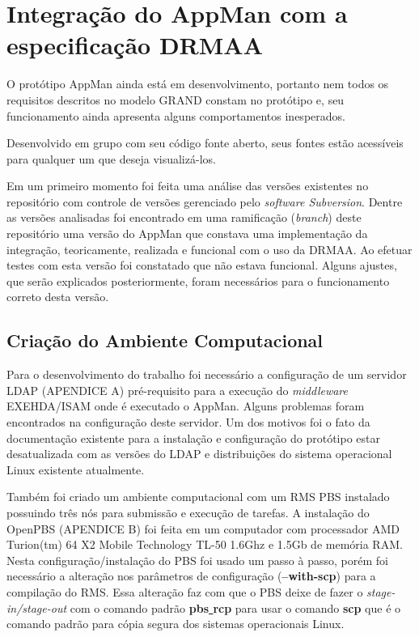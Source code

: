 \chapter{Integração do AppMan com a especificação {DRMAA}}
\label{cap:implementacao}

O protótipo AppMan ainda está em desenvolvimento, portanto nem todos os requisitos descritos no modelo GRAND constam no protótipo e, seu funcionamento ainda apresenta alguns comportamentos inesperados. 

Desenvolvido em grupo com seu código fonte aberto, seus fontes estão acessíveis para qualquer um que deseja visualizá-los. 

Em um primeiro momento foi feita uma análise das versões existentes no repositório com controle de versões gerenciado pelo \emph{software Subversion}. Dentre as versões analisadas foi encontrado em uma ramificação (\emph{branch}) deste repositório uma versão do AppMan que constava uma implementação da integração, teoricamente, realizada e funcional com o uso da DRMAA. Ao efetuar testes com esta versão foi constatado que não estava funcional. Alguns ajustes, que serão explicados posteriormente, foram necessários para o funcionamento correto desta versão.

\section{Criação do Ambiente Computacional}

Para o desenvolvimento do trabalho foi necessário a configuração de um servidor LDAP (APENDICE A) pré-requisito para a execução do \emph{middleware} EXEHDA/ISAM onde é executado o AppMan. Alguns problemas foram encontrados na configuração deste servidor. Um dos motivos foi o fato da documentação existente para a instalação e configuração do protótipo estar desatualizada com as versões do LDAP e distribuições do sistema operacional Linux existente atualmente. 

Também foi criado um ambiente computacional com um RMS PBS instalado possuindo três nós para submissão e execução de tarefas. A instalação do OpenPBS (APENDICE B) foi feita em um computador com processador AMD Turion(tm) 64 X2 Mobile Technology TL-50 1.6Ghz e 1.5Gb de memória RAM. Nesta configuração/instalação do PBS foi usado um passo à passo, porém foi necessário a alteração nos parâmetros de configuração (\textbf{--with-scp}) para a compilação do RMS. Essa alteração faz com que o PBS deixe de fazer o \emph{stage-in/stage-out} com o comando padrão \textbf{pbs\underline{ }rcp} para usar o comando \textbf{scp} que é o comando padrão para cópia segura dos sistemas operacionais Linux.

